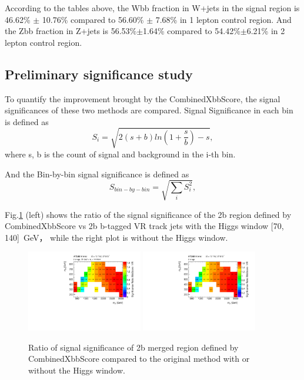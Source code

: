 \par According to the tables above, the Wbb fraction in W+jets in the signal region is 46.62\% $\pm$ 10.76\% compared to 56.60\% $\pm$ 7.68\% in 1 lepton control region. 
And the Zbb fraction in Z+jets is 56.53\%$\pm$1.64\% compared to 54.42\%$\pm$6.21\% in 2 lepton control region.

\subsection{Preliminary significance study}

\par To quantify the improvement brought by the CombinedXbbScore, the signal significances of these two methods are compared.
Signal Significance in each bin is defined as
\begin{equation}
    S_i = \sqrt{2(s + b)ln(1 + \frac{s}{b}) − s},
\end{equation}
where s, b is the count of signal and background in the i-th bin.

\par And the Bin-by-bin signal significance is defined as
\begin{equation}
    S_{bin-by-bin} = \sqrt{\sum_i S_i^2}, 
\end{equation}

\par Fig.\ref{fig:ss_ratio} (left) shows the ratio of the signal significance of the 2b region defined by CombinedXbbScore vs 2b b-tagged VR track jets with the Higgs window [70, 140]~GeV，
while the right plot is without the Higgs window.
\begin{figure}[h]
    \centering
    \includegraphics[width=0.45\textwidth]{appendices/figures/2b-tags_XbbScoreoverVR_HiggsWindow.pdf}
    \includegraphics[width=0.45\textwidth]{appendices/figures/2b-tags_XbbScoreoverVR.pdf}
    \caption{Ratio of signal significance of 2b merged region defined by CombinedXbbScore compared to the original method with or without the Higgs window.}
    \label{fig:ss_ratio}
\end{figure}
